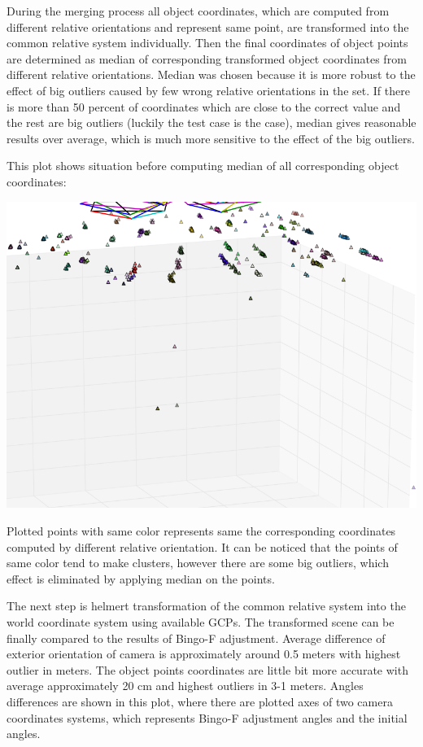 \documentclass[a4paper,12pt]{article}
\begin{document}
During the merging process all object coordinates, which are computed from different relative orientations and represent same point, are 
transformed into  the common relative system individually. Then the final coordinates of object points are determined as median
of corresponding transformed object coordinates from different relative orientations. Median was chosen because it is more robust to the effect of 
big outliers caused by few wrong relative orientations in the set. If there is more than 50 percent of coordinates 
which are close to the correct value and the rest are big outliers (luckily the test case is the case), median gives reasonable results over average,
which is much more sensitive to the effect of the big outliers. 

This plot shows situation before computing median of all corresponding object coordinates:

\includegraphics[scale=0.55]{figures/before_median.png}

Plotted points with same color represents same the corresponding coordinates computed by different relative orientation. It can be noticed that 
the points of same color tend to make clusters, however there are some big outliers, which effect is eliminated by applying
median on the points.

The next step is helmert transformation of the common relative system into the world coordinate system using available GCPs.
The transformed scene can be finally compared to the results of Bingo-F adjustment.
Average difference of exterior orientation 
of camera is approximately around 0.5 meters with highest outlier in meters. The object points coordinates 
are little bit more accurate with average approximately 20 cm and highest outliers in 3-1 meters. 
Angles differences are shown in this plot, where there are plotted axes of two camera coordinates systems, which represents 
Bingo-F adjustment angles and the  initial angles. 
\end{document}
